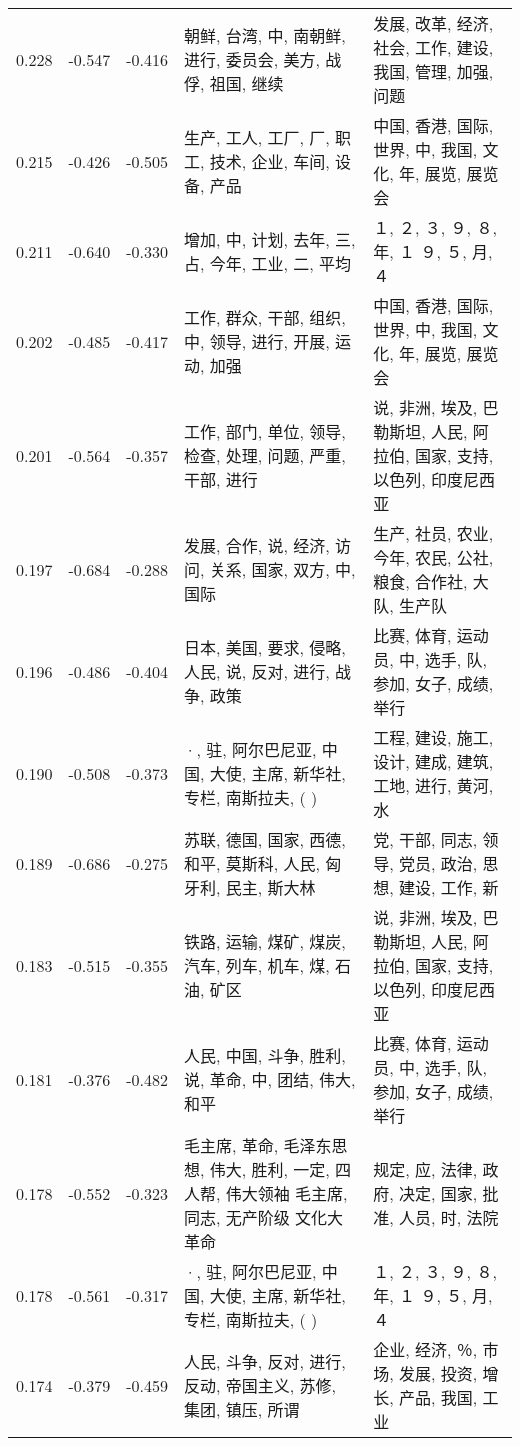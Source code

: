 \begin{tabular}{cccp{5cm}p{5cm}}
0.228 & -0.547 & -0.416 & 朝鲜, 台湾, 中, 南朝鲜, 进行, 委员会, 美方, 战俘, 祖国, 继续 & 发展, 改革, 经济, 社会, 工作, 建设, 我国, 管理, 加强, 问题 \\
0.215 & -0.426 & -0.505 & 生产, 工人, 工厂, 厂, 职工, 技术, 企业, 车间, 设备, 产品 & 中国, 香港, 国际, 世界, 中, 我国, 文化, 年, 展览, 展览会 \\
0.211 & -0.640 & -0.330 & 增加, 中, 计划, 去年, 三, 占, 今年, 工业, 二, 平均 & １, ２, ３, ９, ８, 年, １ ９, ５, 月, ４ \\
0.202 & -0.485 & -0.417 & 工作, 群众, 干部, 组织, 中, 领导, 进行, 开展, 运动, 加强 & 中国, 香港, 国际, 世界, 中, 我国, 文化, 年, 展览, 展览会 \\
0.201 & -0.564 & -0.357 & 工作, 部门, 单位, 领导, 检查, 处理, 问题, 严重, 干部, 进行 & 说, 非洲, 埃及, 巴勒斯坦, 人民, 阿拉伯, 国家, 支持, 以色列, 印度尼西亚 \\
0.197 & -0.684 & -0.288 & 发展, 合作, 说, 经济, 访问, 关系, 国家, 双方, 中, 国际 & 生产, 社员, 农业, 今年, 农民, 公社, 粮食, 合作社, 大队, 生产队 \\
0.196 & -0.486 & -0.404 & 日本, 美国, 要求, 侵略, 人民, 说, 反对, 进行, 战争, 政策 & 比赛, 体育, 运动员, 中, 选手, 队, 参加, 女子, 成绩, 举行 \\
0.190 & -0.508 & -0.373 & ·, 驻, 阿尔巴尼亚, 中国, 大使, 主席, 新华社, 专栏, 南斯拉夫, ( ) & 工程, 建设, 施工, 设计, 建成, 建筑, 工地, 进行, 黄河, 水 \\
0.189 & -0.686 & -0.275 & 苏联, 德国, 国家, 西德, 和平, 莫斯科, 人民, 匈牙利, 民主, 斯大林 & 党, 干部, 同志, 领导, 党员, 政治, 思想, 建设, 工作, 新 \\
0.183 & -0.515 & -0.355 & 铁路, 运输, 煤矿, 煤炭, 汽车, 列车, 机车, 煤, 石油, 矿区 & 说, 非洲, 埃及, 巴勒斯坦, 人民, 阿拉伯, 国家, 支持, 以色列, 印度尼西亚 \\
0.181 & -0.376 & -0.482 & 人民, 中国, 斗争, 胜利, 说, 革命, 中, 团结, 伟大, 和平 & 比赛, 体育, 运动员, 中, 选手, 队, 参加, 女子, 成绩, 举行 \\
0.178 & -0.552 & -0.323 & 毛主席, 革命, 毛泽东思想, 伟大, 胜利, 一定, 四人帮, 伟大领袖 毛主席, 同志, 无产阶级 文化大革命 & 规定, 应, 法律, 政府, 决定, 国家, 批准, 人员, 时, 法院 \\
0.178 & -0.561 & -0.317 & ·, 驻, 阿尔巴尼亚, 中国, 大使, 主席, 新华社, 专栏, 南斯拉夫, ( ) & １, ２, ３, ９, ８, 年, １ ９, ５, 月, ４ \\
0.174 & -0.379 & -0.459 & 人民, 斗争, 反对, 进行, 反动, 帝国主义, 苏修, 集团, 镇压, 所谓 & 企业, 经济, ％, 市场, 发展, 投资, 增长, 产品, 我国, 工业 \\

\end{tabular}
